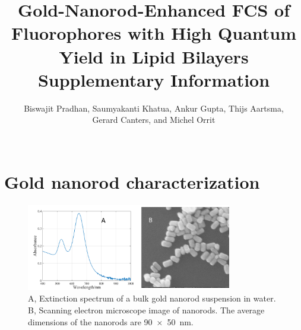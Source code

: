 \documentclass[11pt,a4paper,onecolumn]{article}
\begin{document}
\author{
Biswajit Pradhan, Saumyakanti Khatua, Ankur Gupta,
Thijs Aartsma,\\ Gerard Canters, and Michel Orrit\\\\
}
\date{\vspace{1ex}} %

\title{\textbf{Gold-Nanorod-Enhanced FCS of Fluorophores with High Quantum Yield in Lipid Bilayers}\\ \vspace{3ex} Supplementary Information \vspace{3ex}}

\maketitle
\tableofcontents
\pagebreak

\section{Gold nanorod characterization}
\begin{figure}[ht]
  \centering
  \includegraphics[width=0.8\textwidth]{AuNR_uv-vis_SEM.png}
  \makeatletter
  \renewcommand{\fnum@figure}{\figurename~S\thefigure}
  \makeatother
  \caption{A, Extinction spectrum of a bulk gold nanorod suspension in water. B, Scanning electron microscope image of nanorods.
  The average dimensions of the nanorods are \SI[product-units=repeat]{90x50}{\nm}.}
  \label{SIfig: AuNR_uv-vis}
\end{figure}
\end{document}
